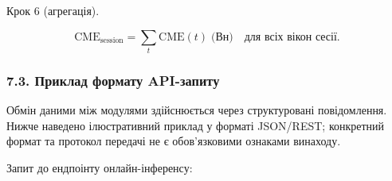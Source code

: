 \documentclass[12pt,a4paper]{article}
\begin{document}
Крок 6 (агрегація).



\[\text{CME}_{\text{session}} = \sum_{t} \text{CME}(t) \;\text{(Вн)} \quad\text{для всіх вікон сесії.}\]



\subsubsection{7.3. Приклад формату API-запиту}\label{ux43fux440ux438ux43aux43bux430ux434-ux444ux43eux440ux43cux430ux442ux443-api-ux437ux430ux43fux438ux442ux443}



Обмін даними між модулями здійснюється через структуровані повідомлення. Нижче наведено ілюстративний приклад у форматі JSON/REST; конкретний формат та протокол передачі не є обов'язковими ознаками винаходу.



Запит до ендпоінту онлайн-інференсу:



\begin{Shaded}

\begin{Highlighting}[]

 

 



\FunctionTok{\{}

    \FunctionTok{:} \FunctionTok{,}

    \FunctionTok{:} \FunctionTok{,}

    \FunctionTok{:} \OtherTok{[}\OtherTok{,} \OtherTok{,} \OtherTok{,} \OtherTok{,} \OtherTok{,} \OtherTok{,} \OtherTok{,} \OtherTok{]}\FunctionTok{,}

    \FunctionTok{:} 

\FunctionTok{\}}

\end{Highlighting}

\end{Shaded}
\end{document}
